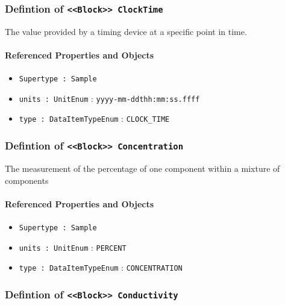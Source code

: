 \subsubsection{Defintion of \texttt{<<Block>> ClockTime}}
  \label{type:ClockTime}

\FloatBarrier

The value provided by a timing device at a specific point in time.

\FloatBarrier
\paragraph{Referenced Properties and Objects}

\begin{itemize}
\item \texttt{Supertype : Sample}

\item \texttt{units : UnitEnum} : \texttt{yyyy-mm-ddthh:mm:ss.ffff}

\item \texttt{type : DataItemTypeEnum} : \texttt{CLOCK_TIME}

\end{itemize}
\FloatBarrier
\subsubsection{Defintion of \texttt{<<Block>> Concentration}}
  \label{type:Concentration}

\FloatBarrier

The measurement of the percentage of one component within a mixture of components

\FloatBarrier
\paragraph{Referenced Properties and Objects}

\begin{itemize}
\item \texttt{Supertype : Sample}

\item \texttt{units : UnitEnum} : \texttt{PERCENT}

\item \texttt{type : DataItemTypeEnum} : \texttt{CONCENTRATION}

\end{itemize}
\FloatBarrier
\subsubsection{Defintion of \texttt{<<Block>> Conductivity}}
  \label{type:Conductivity}

